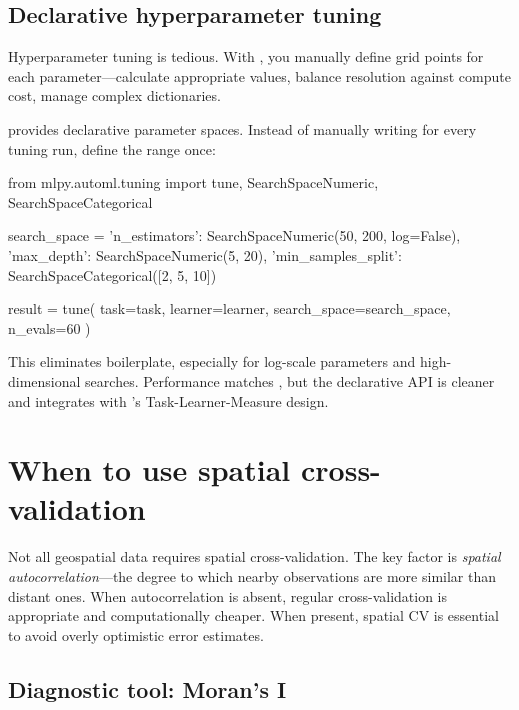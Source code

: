 \documentclass[article]{jss}
\begin{document}
\subsection{Declarative hyperparameter tuning} \label{sec:automl}

Hyperparameter tuning is tedious. With , you manually define grid points for each parameter---calculate appropriate values, balance resolution against compute cost, manage complex dictionaries.

 provides declarative parameter spaces. Instead of manually writing \code{[50, 87, 125, 162, 200]} for every tuning run, define the range once:

\begin{CodeChunk}
\begin{CodeInput}
from mlpy.automl.tuning import tune, SearchSpaceNumeric, SearchSpaceCategorical

search_space = {
    'n_estimators': SearchSpaceNumeric(50, 200, log=False),
    'max_depth': SearchSpaceNumeric(5, 20),
    'min_samples_split': SearchSpaceCategorical([2, 5, 10])
}

result = tune(
    task=task,
    learner=learner,
    search_space=search_space,
    n_evals=60
)
\end{CodeInput}
\end{CodeChunk}

This eliminates boilerplate, especially for log-scale parameters and high-dimensional searches. Performance matches , but the declarative API is cleaner and integrates with 's Task-Learner-Measure design.



\section{When to use spatial cross-validation} \label{sec:when-spatial-cv}

Not all geospatial data requires spatial cross-validation. The key factor is \emph{spatial autocorrelation}---the degree to which nearby observations are more similar than distant ones. When autocorrelation is absent, regular cross-validation is appropriate and computationally cheaper. When present, spatial CV is essential to avoid overly optimistic error estimates.

\subsection{Diagnostic tool: Moran's I}
\end{document}
